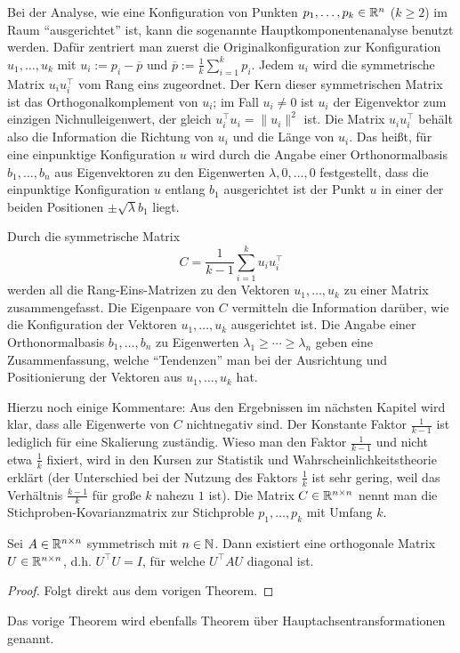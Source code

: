 \begin{bsp}[Hauptkomponentenanalyse]
	Bei der Analyse, wie eine Konfiguration von Punkten $p_1,\ldots, p_k \in \mathbb R^n$ ($k \ge 2$) im Raum ``ausgerichtet'' ist, kann die sogenannte Hauptkomponentenanalyse benutzt werden. Dafür zentriert man zuerst die Originalkonfiguration zur Konfiguration $u_1,\ldots,u_k$ mit $u_i := p_i - \overline{p}$ und $\overline{p} := \frac{1}{k} \sum_{i=1}^k p_i$. Jedem $u_i$ wird die symmetrische Matrix $u_i u_i^\top$ vom Rang eins zugeordnet. Der Kern dieser symmetrischen Matrix ist das Orthogonalkomplement von $u_i$; im Fall $u_i \ne 0$ ist $u_i$ der Eigenvektor zum einzigen Nichnulleigenwert, der gleich $u_i^\top u_i = \|u_i\|^2$ ist. Die Matrix $u_i u_i^\top$ behält also die Information die Richtung von $u_i$ und die Länge von $u_i$. Das heißt, für eine einpunktige Konfiguration $u$ wird durch die Angabe einer Orthonormalbasis $b_1,\ldots,b_n$ aus Eigenvektoren zu den Eigenwerten $\lambda,0,\ldots,0$  festgestellt, dass die einpunktige  Konfiguration $u$ entlang $b_1$ ausgerichtet ist der Punkt $u$  in einer der beiden Positionen $\pm \sqrt{\lambda} b_1$ liegt. 
	
	Durch die symmetrische Matrix
	\[	
	C = \frac{1}{k-1} \sum_{i=1}^k u_i u_i^\top
	\]
	werden all die Rang-Eins-Matrizen zu den Vektoren $u_1,\ldots,u_k$ zu einer Matrix zusammengefasst. Die Eigenpaare von $C$ vermitteln die Information darüber, wie die Konfiguration der Vektoren $u_1,\ldots,u_k$ ausgerichtet ist.
	Die Angabe einer Orthonormalbasis $b_1,\ldots,b_n$ zu Eigenwerten $\lambda_1 \ge \cdots \ge \lambda_n$ geben eine Zusammenfassung, welche ``Tendenzen'' man bei der Ausrichtung und Positionierung der Vektoren  aus $u_1,\ldots,u_k$ hat. 
	
	Hierzu noch einige Kommentare: 
	Aus den Ergebnissen im nächsten Kapitel wird klar, dass alle Eigenwerte von $C$ nichtnegativ sind. Der Konstante Faktor $\frac{1}{k-1}$ ist lediglich für eine Skalierung zuständig. Wieso man den Faktor $\frac{1}{k-1}$ und nicht etwa $\frac{1}{k}$ fixiert, wird in den Kursen zur Statistik und Wahrscheinlichkeitstheorie erklärt (der Unterschied bei der Nutzung des Faktors $\frac{1}{k}$ ist sehr gering, weil das Verhältnis $\frac{k-1}{k}$ für große $k$ nahezu $1$ ist). Die Matrix $C \in \mathbb R^{n \times  n}$ nennt man die Stichproben-Kovarianzmatrix zur Stichproble $p_1,\ldots,p_k$ mit Umfang $k$. 
\end{bsp}


\begin{thm}
	Sei $ A \in \mathbb R^{n \times n} $ symmetrisch mit $ n \in \mathbb N $. Dann existiert eine orthogonale Matrix $ U \in \mathbb R^{n \times n} $, d.h. $ U^\top U = I $, für welche $ U^\top A U $ diagonal ist.
\end{thm}
\begin{proof}
	Folgt direkt aus dem vorigen Theorem.
\end{proof}
\begin{bem}
	Das vorige Theorem wird ebenfalls Theorem über Hauptachsentransformationen genannt.
\end{bem}

